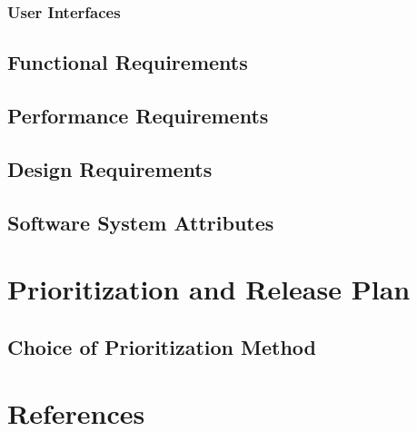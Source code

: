 \documentclass[a4paper,10pt]{article} \usepackage[margin=1.0in]{geometry} \usepackage{pdfpages} \usepackage{graphicx}
\begin{document}
\subsubsection{User Interfaces}
\subsection{Functional Requirements}
\subsection{Performance Requirements}
\subsection{Design Requirements}
\subsection{Software System Attributes}
\newpage

\section{Prioritization and Release Plan}
\subsection{Choice of Prioritization Method}

\newpage
\section{References}
\newpage
\end{document}
